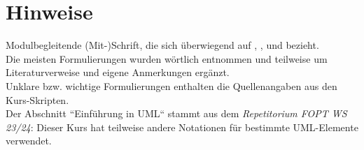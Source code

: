 \section*{Hinweise}
Modulbegleitende (Mit-)Schrift, die sich überwiegend auf \cite{Wed09}, \cite{Wed09b}, \cite{Buh09} und \cite{Wed09c} bezieht.\\
Die meisten Formulierungen wurden wörtlich entnommen und teilweise um Literaturverweise und eigene Anmerkungen ergänzt.\\
Unklare bzw. wichtige Formulierungen enthalten die Quellenangaben aus den Kurs-Skripten.\\
Der Abschnitt ``Einführung in UML`` stammt aus dem \textit{Repetitorium FOPT WS 23/24}: Dieser Kurs hat teilweise andere Notationen für bestimmte UML-Elemente verwendet.